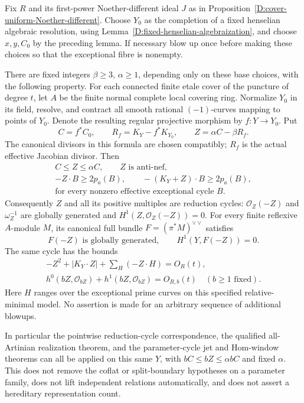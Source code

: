 \begin{proposition}
\label{D:uniform-comparable-reduction-cycle}
Fix $R$ and its first-power Noether-different ideal $J$ as in
Proposition~\ref{D:cover-uniform-Noether-different}. Choose
$Y_0$ as the completion of a fixed henselian algebraic resolution,
using Lemma~\ref{D:fixed-henselian-algebraization}, and choose
$x,y,C_0$ by the preceding lemma. If necessary blow up once
before making these choices so that the exceptional fibre is
nonempty.

There are fixed integers $\beta\ge3$, $\alpha\ge1$, depending
only on these base choices, with the following property.
For each connected finite etale cover of the puncture of degree
$t$, let $A$ be the finite normal complete local covering ring.
Normalize $Y_0$ in its field, resolve, and contract all smooth
rational $(-1)$-curves mapping to points of $Y_0$. Denote the
resulting regular projective morphism by $f:Y\to Y_0$.
Put
\[
 C=f^*C_0,\qquad R_f=K_Y-f^*K_{Y_0},\qquad
                   Z=\alpha C-\beta R_f.                 \tag{D.CR.5}
\]
The canonical divisors in this formula are chosen compatibly;
$R_f$ is the actual effective Jacobian divisor. Then
\[
 \begin{gathered}
 C\le Z\le\alpha C,\qquad Z\text{ is anti-nef},\\
 -Z\cdot B\ge2p_a(B),\qquad
 -(K_Y+Z)\cdot B\ge2p_a(B),\\
 \text{for every nonzero effective exceptional cycle }B.
 \end{gathered}                                           \tag{D.CR.6}
\]
Consequently $Z$ and all its positive multiples are reduction
cycles: $\mathcal O_Z(-Z)$ and $\omega_Z^{-1}$ are globally
generated and $H^1(Z,\mathcal O_Z(-Z))=0$. For every finite
reflexive $A$-module $M$, its canonical full bundle
$F=(\pi^*M)^{\vee\vee}$ satisfies
\[
             F(-Z)\text{ is globally generated},\qquad
                    H^1(Y,F(-Z))=0.                      \tag{D.CR.7}
\]
The same cycle has the bounds
\[
 \begin{gathered}
 -Z^2+|K_Y\cdot Z|+
       \sum_H(-Z\cdot H)=O_R(t),\\
 h^0(bZ,\mathcal O_{bZ})+
       h^1(bZ,\mathcal O_{bZ})=O_{R,b}(t)
                         \quad(b\ge1\text{ fixed}).
 \end{gathered}                                           \tag{D.CR.8}
\]
Here $H$ ranges over the exceptional prime curves on this
specified relative-minimal model. No assertion is made for
an arbitrary sequence of additional blowups.

In particular the pointwise reduction-cycle correspondence,
the qualified all-Artinian realization theorem, and the
parameter-cycle jet and Hom-window theorems can all be applied
on this same $Y$, with
$bC\le bZ\le\alpha bC$ and fixed $\alpha$. This does not
remove the coflat or split-boundary hypotheses on a parameter
family, does not lift independent relations automatically,
and does not assert a hereditary representation count.
\end{proposition}

